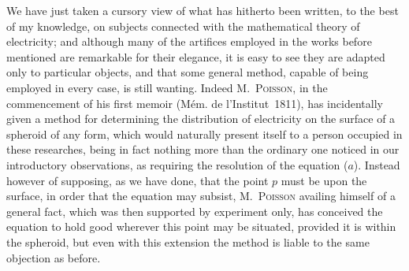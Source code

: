 \documentclass[11pt,notitlepage]{amsart}
\let\Person\textsc
\begin{document}
We have just taken a cursory view of what has hitherto been written,
to the best of my knowledge, on subjects connected with the mathematical
theory of electricity; and although many of the artifices employed in the works
before mentioned are remarkable for their elegance, it is easy to see they are
adapted only to particular objects, and that some general method, capable of
being employed in every case, is still wanting. Indeed M.~\Person{Poisson},
in the commencement of his first memoir
(M\'em. de l'Institut~1811), has incidentally
given a method for determining the distribution of electricity on the surface
of a spheroid of any form, which would naturally present itself to a person
occupied in these researches, being in fact nothing more than the ordinary
one noticed in our introductory observations, as requiring the resolution of
the equation ($a$). Instead however of supposing, as we have done, that the
point $p$ must be upon the surface, in order that the equation may subsist,
M.~\Person{Poisson} availing himself of a general fact,
which was then supported by
experiment only, has conceived the equation to hold good wherever this point
may be situated, provided it is within the spheroid, but even with this 
extension the method is liable to the same objection as before.
\end{document}
